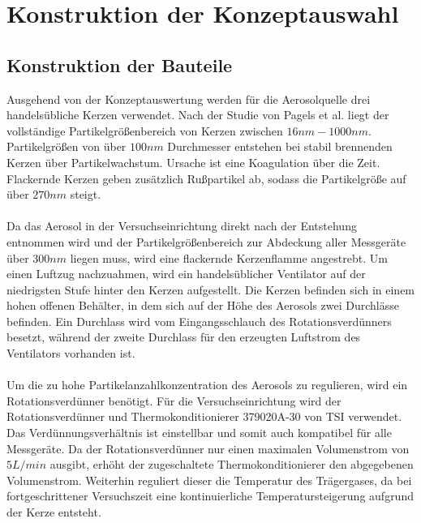 \section{Konstruktion der Konzeptauswahl}

\subsection{Konstruktion der Bauteile}
Ausgehend von der Konzeptauswertung werden für die Aerosolquelle drei handelsübliche Kerzen verwendet. Nach der Studie von Pagels et al.\cite{candle} liegt der vollständige Partikelgrößenbereich von Kerzen zwischen \(16nm - 1000nm\). Partikelgrößen von über \(100nm\) Durchmesser entstehen bei stabil brennenden Kerzen über Partikelwachstum. Ursache ist eine Koagulation über die Zeit. Flackernde Kerzen geben zusätzlich Rußpartikel ab, sodass die Partikelgröße auf über \(270nm\) steigt.
\\\\
Da das Aerosol in der Versuchseinrichtung direkt nach der Entstehung entnommen wird und der Partikelgrößenbereich zur Abdeckung aller Messgeräte über \(300nm\) liegen muss, wird eine flackernde Kerzenflamme angestrebt. Um einen Luftzug nachzuahmen, wird ein handelsüblicher Ventilator auf der niedrigsten Stufe hinter den Kerzen aufgestellt. Die Kerzen befinden sich in einem hohen offenen Behälter, in dem sich auf der Höhe des Aerosols zwei Durchlässe befinden. Ein Durchlass wird vom Eingangsschlauch des Rotationsverdünners besetzt, während der zweite Durchlass für den erzeugten Luftstrom des Ventilators vorhanden ist.
\\\\
Um die zu hohe Partikelanzahlkonzentration des Aerosols zu regulieren, wird ein Rotationsverdünner benötigt. Für die Versuchseinrichtung wird der Rotationsverdünner und Thermokonditionierer 379020A-30 von TSI verwendet. Das Verdünnungsverhältnis ist einstellbar und somit auch kompatibel für alle Messgeräte. Da der Rotationsverdünner nur einen maximalen Volumenstrom von \(5L/min\) ausgibt, erhöht der zugeschaltete Thermokonditionierer den abgegebenen Volumenstrom. Weiterhin reguliert dieser die Temperatur des Trägergases, da bei fortgeschrittener Versuchszeit eine kontinuierliche Temperatursteigerung aufgrund der Kerze entsteht.
\\\\
